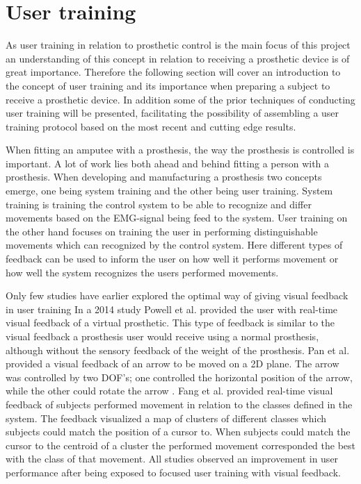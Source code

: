 
\section{User training}

As user training in relation to prosthetic control is the main focus of this project an understanding of this concept in relation to receiving a prosthetic device is of great importance. Therefore the following section will cover an introduction to the concept of user training and its importance when preparing a subject to receive a prosthetic device. In addition some of the prior techniques of conducting user training will be presented, facilitating the possibility of assembling a user training protocol based on the most recent and cutting edge results.   

When fitting an amputee with a prosthesis, the way the prosthesis is controlled is important. A lot of work lies both ahead and behind fitting a person with a prosthesis. When developing and manufacturing a prosthesis two concepts emerge, one being system training and the other being user training. System training is training the control system to be able to recognize and differ movements based on the EMG-signal being feed to the system. \cite{Fougner2012} User training on the other hand focuses on training the user in performing distinguishable movements which can recognized by the control system. Here different types of feedback can be used to inform the user on how well it performs movement or how well the system recognizes the users performed movements. \cite{Powell2014,Simon2013}


Only few studies have earlier explored the optimal way of giving visual feedback in user training \cite{Jiang2012}
In a 2014 study Powell et al. \cite{Powell2014} provided the user with real-time visual feedback of a virtual prosthetic. This type of feedback is similar to the visual feedback a prosthesis user would receive using a normal prosthesis, although without the sensory feedback of the weight of the prosthesis. Pan et al. \cite{Pan2017} provided a visual feedback of an arrow to be moved on a 2D plane. The arrow was controlled by two DOF's; one controlled the horizontal position of the arrow, while the other could rotate the arrow \cite{Pan2017}. Fang et al. \cite{Fang2017} provided real-time visual feedback of subjects performed movement in relation to the classes defined in the system. The feedback visualized a map of clusters of different classes which subjects could match the position of a cursor to. When subjects could match the cursor to the centroid of a cluster the performed movement corresponded the best with the class of that movement. \cite{Fang2017} All studies observed an improvement in user performance after being exposed to focused user training with visual feedback. 
